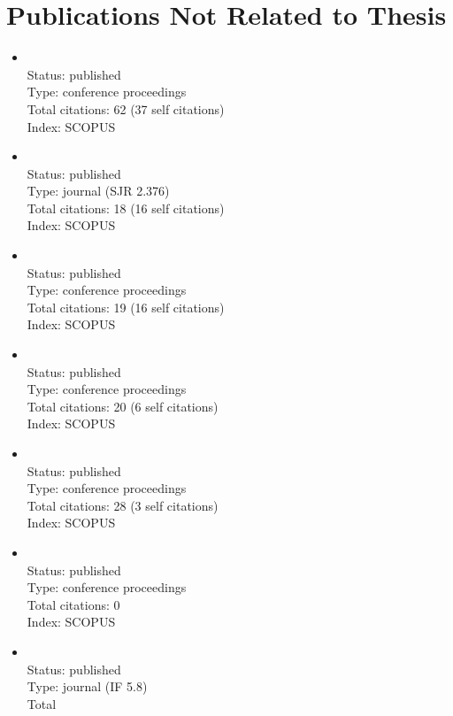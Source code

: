 \section*{Publications Not Related to Thesis}
\begin{itemize}
	\item{}\vspace{2mm}\\Status: published\\Type: conference
	proceedings\\Total citations: 62 (37 self citations)\\Index: SCOPUS
	\item{}\vspace{2mm}\\Status: published\\Type: journal (SJR
	2.376)\\Total citations: 18 (16 self citations)\\Index: SCOPUS
	\item{}\vspace{2mm}\\Status: published\\Type: conference
	proceedings\\Total citations: 19 (16 self citations)\\Index: SCOPUS
	\item{}\vspace{2mm}\\Status: published\\Type: conference
	proceedings\\Total citations: 20 (6 self citations)\\Index: SCOPUS
	\item{}\vspace{2mm}\\Status: published\\Type: conference
	proceedings\\Total citations: 28 (3 self citations)\\Index: SCOPUS
	\item{}\vspace{2mm}\\Status: published\\Type: conference
	proceedings\\Total citations: 0\\Index: SCOPUS
	\item{}\vspace{2mm}\\Status: published\\Type: journal (IF 5.8)\\Total

\end{itemize}

